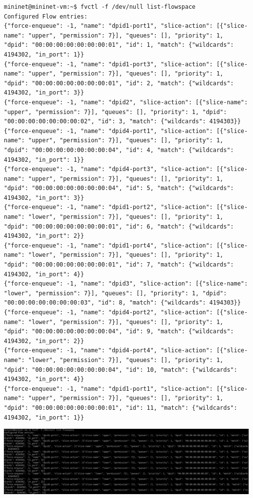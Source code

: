 \documentclass{llncs}
\begin{document}
\begin{itemize}
\begin{lstlisting}
mininet@mininet-vm:~$ fvctl -f /dev/null list-flowspace
Configured Flow entries:
{"force-enqueue": -1, "name": "dpid1-port1", "slice-action": [{"slice-name": "upper", "permission": 7}], "queues": [], "priority": 1, "dpid": "00:00:00:00:00:00:00:01", "id": 1, "match": {"wildcards": 4194302, "in_port": 1}}
{"force-enqueue": -1, "name": "dpid1-port3", "slice-action": [{"slice-name": "upper", "permission": 7}], "queues": [], "priority": 1, "dpid": "00:00:00:00:00:00:00:01", "id": 2, "match": {"wildcards": 4194302, "in_port": 3}}
{"force-enqueue": -1, "name": "dpid2", "slice-action": [{"slice-name": "upper", "permission": 7}], "queues": [], "priority": 1, "dpid": "00:00:00:00:00:00:00:02", "id": 3, "match": {"wildcards": 4194303}}
{"force-enqueue": -1, "name": "dpid4-port1", "slice-action": [{"slice-name": "upper", "permission": 7}], "queues": [], "priority": 1, "dpid": "00:00:00:00:00:00:00:04", "id": 4, "match": {"wildcards": 4194302, "in_port": 1}}
{"force-enqueue": -1, "name": "dpid4-port3", "slice-action": [{"slice-name": "upper", "permission": 7}], "queues": [], "priority": 1, "dpid": "00:00:00:00:00:00:00:04", "id": 5, "match": {"wildcards": 4194302, "in_port": 3}}
{"force-enqueue": -1, "name": "dpid1-port2", "slice-action": [{"slice-name": "lower", "permission": 7}], "queues": [], "priority": 1, "dpid": "00:00:00:00:00:00:00:01", "id": 6, "match": {"wildcards": 4194302, "in_port": 2}}
{"force-enqueue": -1, "name": "dpid1-port4", "slice-action": [{"slice-name": "lower", "permission": 7}], "queues": [], "priority": 1, "dpid": "00:00:00:00:00:00:00:01", "id": 7, "match": {"wildcards": 4194302, "in_port": 4}}
{"force-enqueue": -1, "name": "dpid3", "slice-action": [{"slice-name": "lower", "permission": 7}], "queues": [], "priority": 1, "dpid": "00:00:00:00:00:00:00:03", "id": 8, "match": {"wildcards": 4194303}}
{"force-enqueue": -1, "name": "dpid4-port2", "slice-action": [{"slice-name": "lower", "permission": 7}], "queues": [], "priority": 1, "dpid": "00:00:00:00:00:00:00:04", "id": 9, "match": {"wildcards": 4194302, "in_port": 2}}
{"force-enqueue": -1, "name": "dpid4-port4", "slice-action": [{"slice-name": "lower", "permission": 7}], "queues": [], "priority": 1, "dpid": "00:00:00:00:00:00:00:04", "id": 10, "match": {"wildcards": 4194302, "in_port": 4}}
{"force-enqueue": -1, "name": "dpid1-port1", "slice-action": [{"slice-name": "upper", "permission": 7}], "queues": [], "priority": 1, "dpid": "00:00:00:00:00:00:00:01", "id": 11, "match": {"wildcards": 4194302, "in_port": 1}}
\end{lstlisting}
\includegraphics[scale=0.745]{images/8-6.png} 


\end{itemize}
\end{document}
